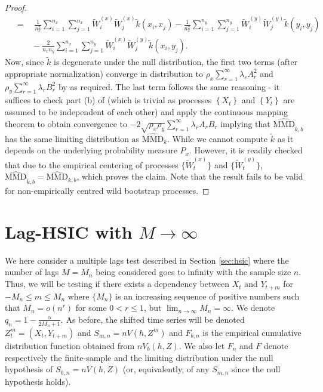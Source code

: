 \begin{proof}
\begin{align*}
{}&=\quad\frac{1}{n_x^2}\sum_{i=1}^{n_x}\sum_{j=1}^{n_x}\tilde W_i^{(x)}\tilde W_j^{(x)}\tilde k(x_i,x_j)-\frac{1}{n_x^2}\sum_{i=1}^{n_y}\sum_{j=1}^{n_y}\tilde W_i^{(y)}\tilde W_j^{(y)}\tilde k(y_i,y_j)\\
{}&\qquad-\frac{2}{n_x n_y}\sum_{i=1}^{n_x}\sum_{j=1}^{n_y}\tilde W_i^{(x)}\tilde W_j^{(y)}\tilde k(x_i,y_j). 
\end{align*}
Now, since $\tilde k$ is degenerate under the null distribution, the first two terms (after appropriate normalization) converge in distribution to $\rho_x\sum_{r=1}^\infty \lambda_r A_r^2$ and  $\rho_y\sum_{r=1}^\infty \lambda_r B_r^2$ by \cite[Theorem 3.1]{leucht_dependent_2013} as required. The last term follows the same reasoning - it suffices to check part (b) of \cite[Theorem 3.1]{leucht_dependent_2013} (which is trivial as processes $\left\{ X_t \right\}$ and $\left\{ Y_t \right\}$ are assumed to be independent of each other) and apply the continuous mapping theorem to obtain convergence to $-2\sqrt{\rho_x\rho_y}\sum_{r=1}^\infty \lambda_r A_rB_r$ implying that $\widehat{\text{MMD}}_{\tilde k, b}$ has the same limiting distribution as $\widehat{\text{MMD}}_{k}$.
While we cannot compute $\tilde k$ as it depends on the underlying probability measure $P_x$. However, it is readily checked that due to the empirical centering of processes $\{\tilde W_t^{(x)}\}$ and $\{\tilde W_t^{(y)}\}$, $\widehat{\text{MMD}}_{\tilde k, b}=\widehat{\text{MMD}}_{k, b}$, which proves the claim. Note that the result fails to be valid for non-empirically centred wild bootstrap processes.
\end{proof}

\section{Lag-HSIC with $M\to\infty$}

We here consider a multiple lags test described in Section \ref{sec:hsic} where the number of lags $M=M_n$ being considered goes to infinity with the sample size $n$. Thus, we will be testing if there exists a dependency between $X_t$ and $Y_{t+m}$ for $-M_n \leq m \leq M_n$ where $\{M_n\}$ is an increasing sequence of positive numbers such that $M_n=o(n^r)$ for some $0<r\leq 1$, but $\lim_{n\to\infty}M_n=\infty$. 
We denote $q_{n} = 1-\frac{\alpha}{2M_n+1}$. As before, the shifted time series will be denoted $Z_t^m =(X_t,Y_{t+m})$ and $S_{m,n}=n V(h,Z^m)$ and $F_{b,n}$ is the empirical cumulative distribution function obtained from $n V_b(h,Z)$. We also let $F_n$ and $F$ denote respectively the finite-sample and the limiting distribution under the null hypothesis of $S_{0,n} = n V(h,Z)$ (or, equivalently, of any $S_{m,n}$ since the null hypothesis holds).


